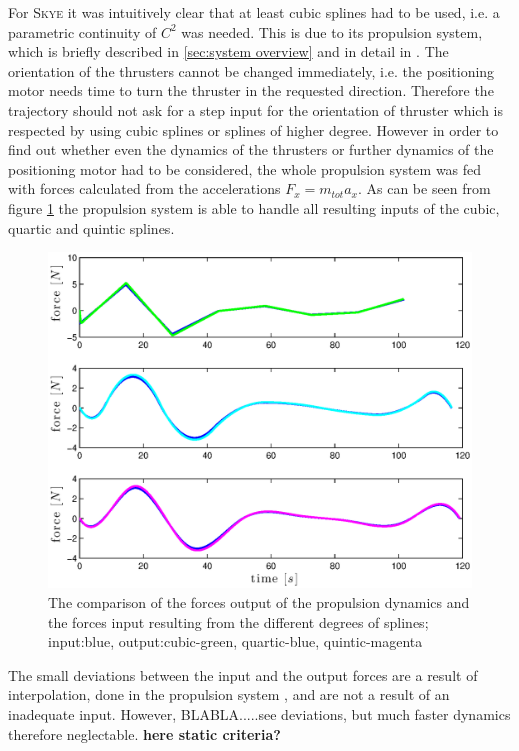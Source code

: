  For \textsc{Skye} it was intuitively clear that at least cubic splines had to be used, i.e. a parametric continuity of $C^2$ was needed. This is due to its propulsion system, which is briefly described in \ref{sec:system overview} and in detail in \cite{schaffnervu}. The orientation of the thrusters cannot be changed immediately, i.e. the positioning motor needs time to turn the thruster in the requested direction. Therefore the trajectory should not ask for a step input for the orientation of thruster which is respected by using cubic splines or splines of higher degree. However in order to find out whether even the dynamics of the thrusters or further dynamics of the positioning motor had to be considered, the whole propulsion system was fed with forces calculated from the accelerations $F_x=m_{tot}a_x$. As can be seen from figure \ref{fig:forces} the propulsion system is able to handle all resulting inputs of the cubic, quartic and quintic splines.
 
\begin{figure}[H]
  \begin{minipage}[t]{0.96\textwidth}
    \includegraphics[width = \textwidth]{graphics/forces.eps}
  \end{minipage}
  \caption{The comparison of the forces output of the propulsion dynamics and the forces input resulting from the different degrees of splines; input:blue, output:cubic-green, quartic-blue, quintic-magenta}
\label{fig:forces}
\end{figure} 

The small deviations between the input and the output forces are a result of interpolation, done in the propulsion system \cite{schaffnervu}, and are not a result of an inadequate input. However, BLABLA.....see deviations, but much faster dynamics therefore neglectable.
{\bf here static criteria?}

